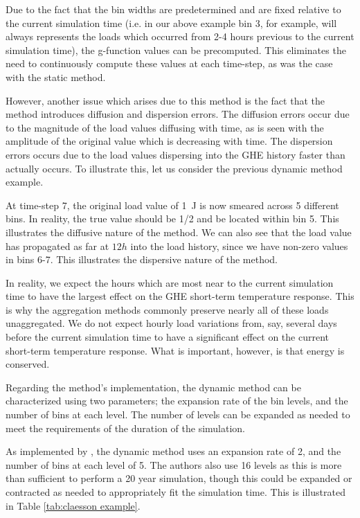 \documentclass[review,12pt]{elsarticle}
\begin{document}
Due to the fact that the bin widths are predetermined and are fixed relative to the current simulation time (i.e. in our above example bin 3, for example, will always represents the loads which occurred from 2-4 hours previous to the current simulation time), the g-function values can be precomputed. This eliminates the need to continuously compute these values at each time-step, as was the case with the static method.

However, another issue which arises due to this method is the fact that the method introduces diffusion and dispersion errors. The diffusion errors occur due to the magnitude of the load values diffusing with time, as is seen with the amplitude of the original value which is decreasing with time. The dispersion errors occurs due to the load values dispersing into the GHE history faster than actually occurs. To illustrate this, let us consider the previous dynamic method example.

At time-step 7, the original load value of \SI{1}{\joule} is now smeared across 5 different bins. In reality, the  true value should be 1/2 and be located within bin 5. This illustrates the diffusive nature of the method. We can also see that the load value has propagated as far at $12h$ into the load history, since we have non-zero values in bins 6-7. This illustrates the dispersive nature of the method.

In reality, we expect the hours which are most near to the current simulation time to have the largest effect on the GHE short-term temperature response. This is why the aggregation methods commonly preserve nearly all of these loads unaggregated. We do not expect hourly load variations from, say, several days before the current simulation time to have a significant effect on the current short-term temperature response. What is important, however, is that energy is conserved.

Regarding the method's implementation, the dynamic method can be characterized using two parameters; the expansion rate of the bin levels, and the number of bins at each level. The number of levels can be expanded as needed to meet the requirements of the duration of the simulation.

As implemented by \cite{ClaessonJaved2012}, the dynamic method uses an expansion rate of 2, and the number of bins at each level of 5. The authors also use 16 levels as this is more than sufficient to perform a 20 year simulation, though this could be expanded or contracted as needed to appropriately fit the simulation time. This is illustrated in Table \ref{tab:claesson example}.
\end{document}
